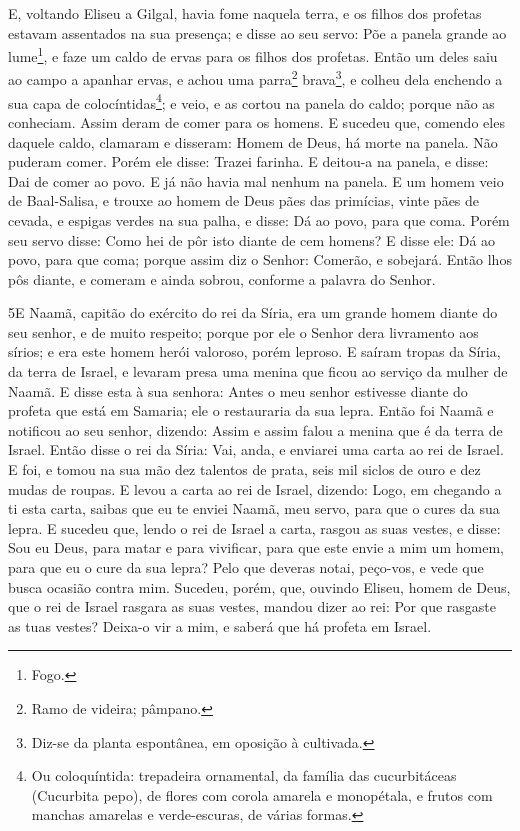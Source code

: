 E, voltando Eliseu a Gilgal, havia fome naquela terra, e os
filhos dos profetas estavam assentados na sua presença; e disse ao
seu servo: Põe a panela grande ao lume\footnote{Fogo.}, e faze um
caldo de ervas para os filhos dos profetas. Então um deles
saiu ao campo a apanhar ervas, e achou uma parra\footnote{Ramo de
videira; pâmpano.} brava\footnote{Diz-se da planta espontânea, em
oposição à cultivada.}, e colheu dela enchendo a sua capa de
colocíntidas\footnote{Ou coloquíntida: trepadeira ornamental, da
família das cucurbitáceas (Cucurbita pepo), de flores com corola
amarela e monopétala, e frutos com manchas amarelas e verde-escuras,
de várias formas.}; e veio, e as cortou na panela do caldo; porque
não as conheciam. Assim deram de comer para os homens. E
sucedeu que, comendo eles daquele caldo, clamaram e disseram: Homem
de Deus, há morte na panela. Não puderam comer. Porém ele
disse: Trazei farinha. E deitou-a na panela, e disse: Dai de comer
ao povo. E já não havia mal nenhum na panela. E um homem veio
de Baal-Salisa, e trouxe ao homem de Deus pães das primícias, vinte
pães de cevada, e espigas verdes na sua palha, e disse: Dá ao povo,
para que coma. Porém seu servo disse: Como hei de pôr isto
diante de cem homens? E disse ele: Dá ao povo, para que coma; porque
assim diz o Senhor: Comerão, e sobejará. Então lhos pôs
diante, e comeram e ainda sobrou, conforme a palavra do Senhor.

\medskip

\lettrine{5} E Naamã, capitão do exército do rei da Síria, era
um grande homem diante do seu senhor, e de muito respeito; porque
por ele o Senhor dera livramento aos sírios; e era este homem herói
valoroso, porém leproso. E saíram tropas da Síria, da terra de
Israel, e levaram presa uma menina que ficou ao serviço da mulher de
Naamã. E disse esta à sua senhora: Antes o meu senhor estivesse
diante do profeta que está em Samaria; ele o restauraria da sua
lepra. Então foi Naamã e notificou ao seu senhor, dizendo: Assim
e assim falou a menina que é da terra de Israel. Então disse o
rei da Síria: Vai, anda, e enviarei uma carta ao rei de Israel. E
foi, e tomou na sua mão dez talentos de prata, seis mil siclos de
ouro e dez mudas de roupas. E levou a carta ao rei de Israel,
dizendo: Logo, em chegando a ti esta carta, saibas que eu te enviei
Naamã, meu servo, para que o cures da sua lepra. E sucedeu que,
lendo o rei de Israel a carta, rasgou as suas vestes, e disse: Sou
eu Deus, para matar e para vivificar, para que este envie a mim um
homem, para que eu o cure da sua lepra? Pelo que deveras notai,
peço-vos, e vede que busca ocasião contra mim. Sucedeu, porém,
que, ouvindo Eliseu, homem de Deus, que o rei de Israel rasgara as
suas vestes, mandou dizer ao rei: Por que rasgaste as tuas vestes?
Deixa-o vir a mim, e saberá que há profeta em Israel.

